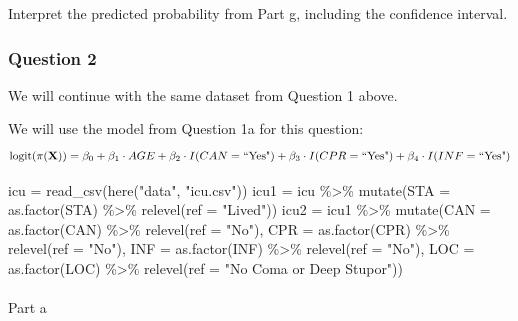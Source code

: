 \documentclass[
  letterpaper,
  DIV=11,
  numbers=noendperiod]{scrartcl}
\makeatletter
\let\oldparagraph\paragraph
\renewcommand{\paragraph}{
    \@ifstar
      \xxxParagraphStar
      \xxxParagraphNoStar
  }
\newcommand{\xxxParagraphStar}[1]{\oldparagraph*{#1}\mbox{}}
\newcommand{\xxxParagraphNoStar}[1]{\oldparagraph{#1}\mbox{}}
\newenvironment{Shaded}{\begin{snugshade}}{\end{snugshade}}
\newcommand{\AttributeTok}[1]{\textcolor[rgb]{0.40,0.45,0.13}{#1}}
\newcommand{\FunctionTok}[1]{\textcolor[rgb]{0.28,0.35,0.67}{#1}}
\newcommand{\NormalTok}[1]{\textcolor[rgb]{0.00,0.23,0.31}{#1}}
\newcommand{\OtherTok}[1]{\textcolor[rgb]{0.00,0.23,0.31}{#1}}
\newcommand{\SpecialCharTok}[1]{\textcolor[rgb]{0.37,0.37,0.37}{#1}}
\newcommand{\StringTok}[1]{\textcolor[rgb]{0.13,0.47,0.30}{#1}}
\makeatother
\begin{document}
Interpret the predicted probability from Part g, including the
confidence interval.

\subsubsection{Question 2}\label{question-2}

We will continue with the same dataset from Question 1 above.

We will use the model from Question 1a for this question:
\[\text{logit}(\pi(\textbf{X}))=\beta_0 + \beta_1 \cdot AGE + \beta_2 \cdot I(CAN=\text{``Yes"}) + \beta_3 \cdot I(CPR=\text{``Yes"}) + \\ \beta_4 \cdot I(INF=\text{``Yes"})\]

\begin{Shaded}
\begin{Highlighting}[]
\NormalTok{icu }\OtherTok{=} \FunctionTok{read\_csv}\NormalTok{(}\FunctionTok{here}\NormalTok{(}\StringTok{"data"}\NormalTok{, }\StringTok{"icu.csv"}\NormalTok{))}
\NormalTok{icu1 }\OtherTok{=}\NormalTok{ icu }\SpecialCharTok{\%\textgreater{}\%} \FunctionTok{mutate}\NormalTok{(}\AttributeTok{STA =} \FunctionTok{as.factor}\NormalTok{(STA) }\SpecialCharTok{\%\textgreater{}\%} \FunctionTok{relevel}\NormalTok{(}\AttributeTok{ref =} \StringTok{"Lived"}\NormalTok{))}
\NormalTok{icu2 }\OtherTok{=}\NormalTok{ icu1 }\SpecialCharTok{\%\textgreater{}\%} \FunctionTok{mutate}\NormalTok{(}\AttributeTok{CAN =} \FunctionTok{as.factor}\NormalTok{(CAN) }\SpecialCharTok{\%\textgreater{}\%} \FunctionTok{relevel}\NormalTok{(}\AttributeTok{ref =} \StringTok{"No"}\NormalTok{), }
                     \AttributeTok{CPR =} \FunctionTok{as.factor}\NormalTok{(CPR) }\SpecialCharTok{\%\textgreater{}\%} \FunctionTok{relevel}\NormalTok{(}\AttributeTok{ref =} \StringTok{"No"}\NormalTok{), }
                     \AttributeTok{INF =} \FunctionTok{as.factor}\NormalTok{(INF) }\SpecialCharTok{\%\textgreater{}\%} \FunctionTok{relevel}\NormalTok{(}\AttributeTok{ref =} \StringTok{"No"}\NormalTok{), }
                     \AttributeTok{LOC =} \FunctionTok{as.factor}\NormalTok{(LOC) }\SpecialCharTok{\%\textgreater{}\%} 
                       \FunctionTok{relevel}\NormalTok{(}\AttributeTok{ref =} \StringTok{"No Coma or Deep Stupor"}\NormalTok{))}
\end{Highlighting}
\end{Shaded}

\paragraph{Part a}\label{part-a-1}
\end{document}
